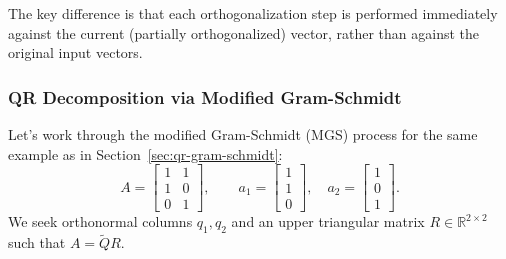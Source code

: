 The key difference is that each orthogonalization step is performed immediately against the current (partially orthogonalized) vector, rather than against the original input vectors.

\subsubsection{QR Decomposition via Modified Gram-Schmidt}

Let's work through the modified Gram-Schmidt (MGS) process for the same example as in Section~\ref{sec:qr-gram-schmidt}:
\[
    A = \begin{bmatrix} 1 & 1 \\ 1 & 0 \\ 0 & 1 \end{bmatrix},
    \qquad a_1 = \begin{bmatrix} 1 \\ 1 \\ 0 \end{bmatrix},\quad a_2 = \begin{bmatrix} 1 \\ 0 \\ 1 \end{bmatrix}.
\]
We seek orthonormal columns $q_1, q_2$ and an upper triangular matrix $R \in \mathbb{R}^{2 \times 2}$ such that $A = \widetilde{Q} R$.

